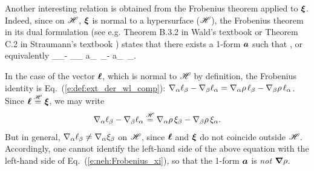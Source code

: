 Another interesting relation is obtained from the Frobenius theorem
applied to $\bm{\xi}$. Indeed, since on $\mathscr{H}$, $\bm{\xi}$ is normal to a hypersurface
($\mathscr{H}$), the Frobenius theorem in its dual formulation
(see e.g.
Theorem B.3.2 in Wald's textbook \cite{Wald84} or Theorem C.2 in
Straumann's textbook \cite{Strau13}) states that there exists a 1-form
$\bm{a}$ such that
\be
    \dd \uu{\xi} \equalH {} \wedge \uu{\xi} ,
\ee
or equivalently
\be \label{e:neh:Frobenius_xi}
  \nabla_\alpha \xi_\beta - \nabla_\beta \xi_\alpha \equalH
  a_\alpha \, \xi_\beta -  a_\beta  \, \xi_\alpha  .
\ee

\begin{remark}
In the case of the vector $\bm{\ell}$, which is normal to $\mathscr{H}$ by definition,
the Frobenius identity is
Eq.~(\ref{e:def:ext_der_wl_comp}): $\nabla_\alpha \ell_\beta - \nabla_\beta \ell_\alpha =
  \nabla_\alpha \rho \, \ell_\beta -  \nabla_\beta \rho \, \ell_\alpha$.
Since $\bm{\ell} \stackrel{\mathscr{H}}{=} \bm{\xi}$, we may write
\[
  \nabla_\alpha \ell_\beta - \nabla_\beta \ell_\alpha \stackrel{\mathscr{H}}{=}
  \nabla_\alpha \rho \, \xi_\beta -  \nabla_\beta \rho \, \xi_\alpha .
\]
But in general,  $\nabla_\alpha \ell_\beta \not= \nabla_\alpha \xi_\beta$ on $\mathscr{H}$,
since $\bm{\ell}$ and $\bm{\xi}$ do not coincide outside $\mathscr{H}$. Accordingly, one
cannot identify the left-hand side of the above equation with the left-hand side
of Eq.~(\ref{e:neh:Frobenius_xi}), so that the 1-form $\bm{a}$ is \emph{not} $\bm{\nabla}\rho$.
\end{remark}

